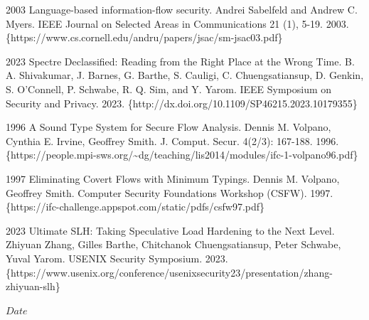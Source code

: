 \documentclass[12pt]{report}
\begin{document}
   2003 Language-based information-flow security.  Andrei
  Sabelfeld and Andrew C. Myers. IEEE Journal on Selected Areas in
  Communications 21 (1), 5-19. 2003.
  \{https://www.cs.cornell.edu/andru/papers/jsac/sm-jsac03.pdf\}


   2023 Spectre Declassified: Reading from the Right Place
  at the Wrong Time. B. A. Shivakumar, J. Barnes, G. Barthe, S. Cauligi,
  C. Chuengsatiansup, D. Genkin, S. O’Connell, P. Schwabe, R. Q. Sim, and
  Y. Yarom.  IEEE Symposium on Security and Privacy. 2023.
  \{http://dx.doi.org/10.1109/SP46215.2023.10179355\}


   1996 A Sound Type System for Secure Flow Analysis. Dennis
  M. Volpano, Cynthia E. Irvine, Geoffrey Smith. J. Comput. Secur. 4(2/3):
  167-188. 1996. \{https://people.mpi-sws.org/\~{}dg/teaching/lis2014/modules/ifc-1-volpano96.pdf\}


   1997 Eliminating Covert Flows with Minimum
  Typings. Dennis M. Volpano, Geoffrey Smith. Computer Security Foundations
  Workshop
  (CSFW). 1997. \{https://ifc-challenge.appspot.com/static/pdfs/csfw97.pdf\}


   2023 Ultimate SLH: Taking Speculative Load Hardening to the
  Next Level. Zhiyuan Zhang, Gilles Barthe, Chitchanok Chuengsatiansup, Peter
  Schwabe, Yuval Yarom. USENIX Security Symposium. 2023.
  \{https://www.usenix.org/conference/usenixsecurity23/presentation/zhang-zhiyuan-slh\}




 $Date$ 
\begin{coqdoccode}
\coqdocemptyline
\end{coqdoccode}
\end{document}
